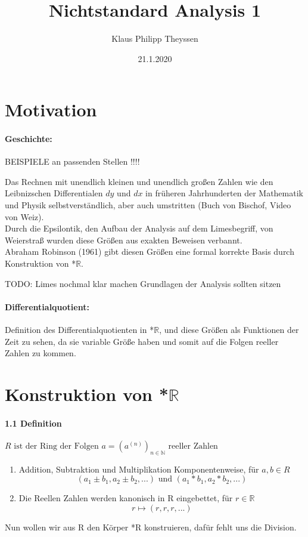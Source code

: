\documentclass[a4paper]{article}
\title{Nichtstandard Analysis 1}
\date{21.1.2020}
\author{Klaus Philipp Theyssen}
\begin{document}
\maketitle


\section{Motivation}

\paragraph{Geschichte:}  
BEISPIELE an passenden Stellen !!!! \bigskip %

Das Rechnen mit unendlich kleinen und unendlich großen Zahlen wie den Leibnizschen Differentialen
$ dy $ und $ dx $ in früheren Jahrhunderten der Mathematik und Physik selbstverständlich, 
aber auch umstritten (Buch von Bischof, Video von Weiz). \\
Durch die Epsilontik, den Aufbau der Analysis auf dem Limesbegriff, von Weierstraß wurden diese Größen aus 
exakten Beweisen verbannt. \\ 
Abraham Robinson (1961) gibt diesen Größen eine formal korrekte Basis durch Konstruktion von *$\mathbb{R}$.

\bigskip
TODO: Limes nochmal klar machen Grundlagen der Analysis sollten sitzen 


\paragraph{Differentialquotient:}
Definition des Differentialquotienten in *$\mathbb{R}$, und diese Größen als Funktionen der Zeit zu sehen,
da sie variable Größe haben und somit auf die Folgen reeller Zahlen zu kommen.


\section{Konstruktion von *$\mathbb{R}$}
\paragraph{1.1 Definition} $ R \text{ ist der Ring der Folgen }  a = (a^{(n)})_{n \in \mathbb{N}} \text{ reeller Zahlen} $
\begin{enumerate}
      \item Addition, Subtraktion und Multiplikation Komponentenweise, für $a, b \in R$  
            $$ (a_1 \pm b_1, a_2 \pm b_2,...) \text{ und } (a_1 * b_1, a_2 * b_2,...) $$ 
      \item Die Reellen Zahlen werden kanonisch in R eingebettet, für $ r \in \mathbb{R} $ 
            $$ r \mapsto (r,r,r,...) $$
\end{enumerate}
\smallskip
Nun wollen wir aus R den Körper *R konstruieren, dafür fehlt uns die Division. 
\end{document}
